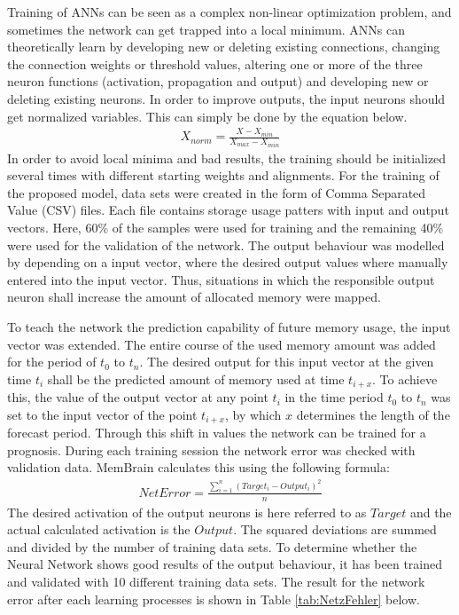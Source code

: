 Training of ANNs can be seen as a complex non-linear optimization problem, and sometimes the network can  get trapped into a local minimum. ANNs can theoretically learn by developing new or deleting existing connections, changing the connection weights or threshold values, altering one or more of the three neuron functions (activation, propagation and output) and developing new or deleting existing neurons. In order to improve outputs, the input neurons should get normalized variables. This can simply be done by the equation below.
\begin{eqnarray}
X_{norm}  = \frac{X - X_{min}}{X_{max} - X_{min} }
\end{eqnarray}
In order to avoid local minima and bad results, the training should be initialized several times with different  starting weights and alignments. For the training of the proposed model, data sets were created in the form of Comma Separated Value (CSV) files. Each file contains storage usage patters with input and output vectors. Here, 60\% of the samples were used for training and the remaining 40\% were used for the validation of the network. The output behaviour was modelled by depending on a input vector, where the desired output values where manually entered into the input vector. Thus, situations in which the responsible output neuron shall increase the amount of allocated memory were mapped.

To teach the network the prediction capability of future memory usage, the input vector was extended. The entire course of the used memory amount was added for the period of $ t_{0} $ to $ t_{n} $.  The desired output for this input vector at the given time $ t_{i} $ shall be the predicted amount of memory used at time $ t_{i + x} $. To achieve this, the value of the output vector at any point $ t_{i} $ in the time period $ t_{0} $ to $ t_{n} $ was set to the input vector of the point $ t_{i+x} $, by which $ x $ determines the length of the forecast period. Through this shift in values ​​the network can be trained for a prognosis. During each training session the network error was checked with validation data. MemBrain calculates this using the following formula: \begin{eqnarray}
NetError = \frac{\sum\limits_{i=1}^n{(Target_{i} - Output_{i})^2}}{n}
\end{eqnarray}
The desired activation of the output neurons is here referred to as $ Target $ and the actual calculated activation is the $ Output $. The squared deviations are summed and divided by the number of training data sets. To determine whether the Neural Network shows good results of the output behaviour, it has been trained and validated with 10 different training data sets. The result for the network error after each learning processes is shown in Table \ref{tab:NetzFehler} below.

